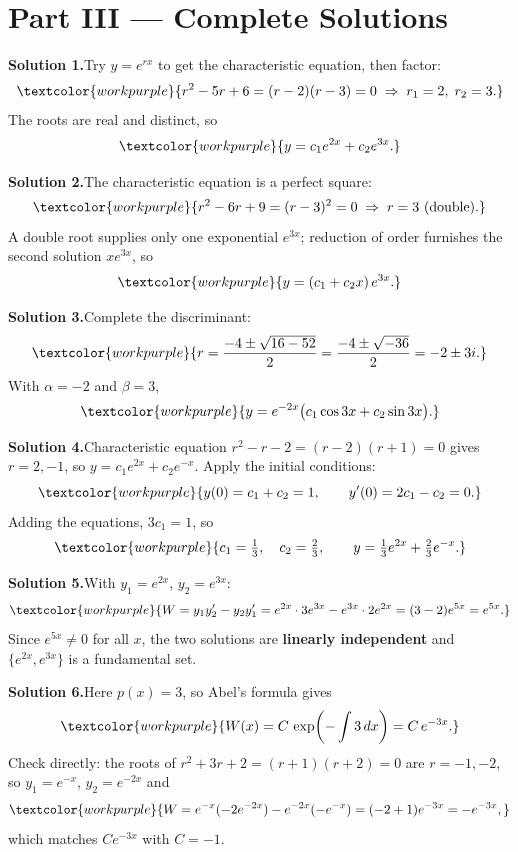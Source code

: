 \section*{Part III --- Complete Solutions}

\noindent\textbf{Solution 1.}\quad Try $y=e^{rx}$ to get the characteristic
equation, then factor:
\[ \textcolor{workpurple}{r^2 - 5r + 6 = (r-2)(r-3) = 0 \;\Rightarrow\; r_1 = 2,\; r_2 = 3.} \]
The roots are real and distinct, so
\[ \textcolor{workpurple}{y = c_1 e^{2x} + c_2 e^{3x}.} \]

\medskip
\noindent\textbf{Solution 2.}\quad The characteristic equation is a perfect
square:
\[ \textcolor{workpurple}{r^2 - 6r + 9 = (r-3)^2 = 0 \;\Rightarrow\; r = 3 \text{ (double)}.} \]
A double root supplies only one exponential $e^{3x}$; reduction of order furnishes
the second solution $x e^{3x}$, so
\[ \textcolor{workpurple}{y = (c_1 + c_2 x)\,e^{3x}.} \]

\medskip
\noindent\textbf{Solution 3.}\quad Complete the discriminant:
\[ \textcolor{workpurple}{r = \frac{-4 \pm \sqrt{16 - 52}}{2} = \frac{-4 \pm \sqrt{-36}}{2} = -2 \pm 3i.} \]
With $\alpha=-2$ and $\beta=3$,
\[ \textcolor{workpurple}{y = e^{-2x}\big(c_1\cos 3x + c_2\sin 3x\big).} \]

\medskip
\noindent\textbf{Solution 4.}\quad Characteristic equation
$r^2 - r - 2 = (r-2)(r+1)=0$ gives $r=2,-1$, so
$y = c_1 e^{2x} + c_2 e^{-x}$. Apply the initial conditions:
\[ \textcolor{workpurple}{y(0) = c_1 + c_2 = 1, \qquad y'(0) = 2c_1 - c_2 = 0.} \]
Adding the equations, $3c_1 = 1$, so
\[ \textcolor{workpurple}{c_1 = \tfrac{1}{3},\quad c_2 = \tfrac{2}{3}, \qquad
   y = \tfrac{1}{3} e^{2x} + \tfrac{2}{3} e^{-x}.} \]

\medskip
\noindent\textbf{Solution 5.}\quad With $y_1=e^{2x}$, $y_2=e^{3x}$:
\[ \textcolor{workpurple}{W = y_1 y_2' - y_2 y_1' = e^{2x}\cdot 3e^{3x} - e^{3x}\cdot 2e^{2x} = (3-2)e^{5x} = e^{5x}.} \]
Since $e^{5x}\neq 0$ for all $x$, the two solutions are \textbf{linearly
independent} and $\{e^{2x},e^{3x}\}$ is a fundamental set.

\medskip
\noindent\textbf{Solution 6.}\quad Here $p(x)=3$, so Abel's formula gives
\[ \textcolor{workpurple}{W(x) = C\,\exp\!\left(-\int 3\,dx\right) = C\,e^{-3x}.} \]
Check directly: the roots of $r^2+3r+2=(r+1)(r+2)=0$ are $r=-1,-2$, so
$y_1=e^{-x}$, $y_2=e^{-2x}$ and
\[ \textcolor{workpurple}{W = e^{-x}(-2e^{-2x}) - e^{-2x}(-e^{-x}) = (-2+1)e^{-3x} = -e^{-3x},} \]
which matches $C e^{-3x}$ with $C=-1$.

